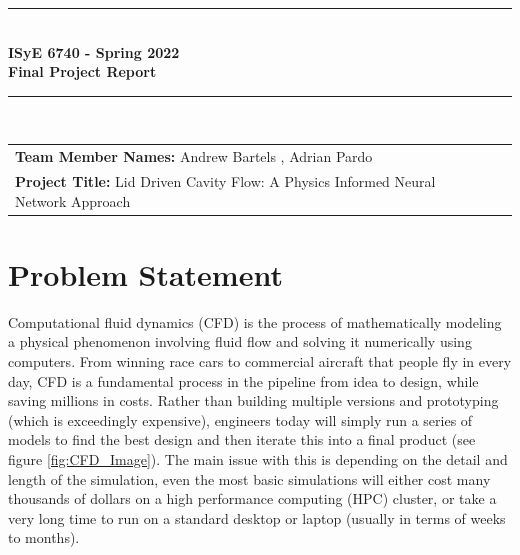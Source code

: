 \documentclass{article}
\begin{document}
	\begin{titlepage}
		\clearpage\thispagestyle{empty}
		\centering
		\vspace{1cm}
		
		\rule{\linewidth}{1mm} \\[0.5cm]
		{ \Large \bfseries ISyE 6740 - Spring 2022\\[0.2cm]
			Final Project Report}\\[0.5cm]
		\rule{\linewidth}{1mm} \\[1cm]
		
		\begin{tabular}{l p{5cm}}
			\textbf{Team Member Names:} Andrew Bartels , Adrian Pardo &   \\[10pt]
			\textbf{Project Title:} Lid Driven Cavity Flow: 
			A Physics Informed Neural Network Approach &  \\[10pt]
			
		\end{tabular} 
	\end{titlepage}
	
	\tableofcontents
	\clearpage
	\thispagestyle{empty}
    \listoffigures
    \newpage

	\section{Problem Statement}
	
	\indent Computational fluid dynamics (CFD) is the process of mathematically modeling a physical phenomenon involving fluid flow and solving it numerically using computers\cite{SimScale}. From winning race cars to commercial aircraft that people fly in every day, CFD is a fundamental process in the pipeline from idea to design, while saving millions in costs. Rather than building multiple versions and prototyping (which is exceedingly expensive), engineers today will simply run a series of models to find the best design and then iterate this into a final product (see figure \ref{fig:CFD_Image}). The main issue with this is depending on the detail and length of the simulation, even the most basic simulations will either cost many thousands of dollars on a high performance computing (HPC) cluster, or take a very long time to run on a standard desktop or laptop (usually in terms of weeks to months).
	
\end{document}
